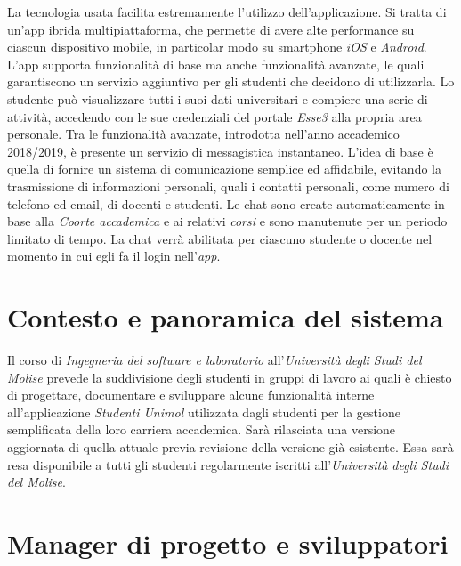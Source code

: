La tecnologia usata facilita estremamente l'utilizzo dell'applicazione. Si tratta di un’app ibrida multipiattaforma, che permette di avere alte performance su ciascun dispositivo mobile, in particolar modo su smartphone \textit{iOS} e \textit{Android}.  L’app supporta funzionalità di base ma anche funzionalità avanzate, le quali garantiscono un servizio aggiuntivo per gli studenti che decidono di utilizzarla. Lo studente può visualizzare tutti i suoi dati universitari e compiere una serie di attività, accedendo con le sue credenziali del portale \textit{Esse3} alla propria area personale. Tra le funzionalità avanzate, introdotta nell'anno accademico 2018/2019, è presente un servizio di messagistica instantaneo.
L'idea di base è quella di fornire un sistema di comunicazione semplice ed affidabile, evitando la trasmissione di informazioni personali, quali i contatti personali, come numero di telefono ed email, di docenti e studenti.
Le chat sono create automaticamente in base alla \textit{Coorte accademica} e ai relativi \textit{corsi} e sono manutenute per un periodo limitato di tempo. La chat verrà abilitata per ciascuno studente o docente nel momento in cui egli fa il login nell’\textit{app}.


\section{Contesto e panoramica del sistema}
Il corso di \textit{Ingegneria del software e laboratorio} all'\textit{Università degli Studi del Molise} prevede la suddivisione degli studenti in gruppi di lavoro ai quali è chiesto di progettare, documentare e sviluppare alcune funzionalità interne all'applicazione \textit{Studenti Unimol} utilizzata dagli studenti per la gestione semplificata della loro carriera accademica. Sarà rilasciata una versione aggiornata di quella attuale previa revisione della versione già esistente. Essa sarà resa disponibile a tutti gli studenti regolarmente iscritti all'\textit{Università degli Studi del Molise}.

\section{Manager di progetto e sviluppatori}

